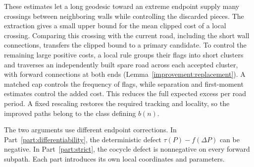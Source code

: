 These estimates let a long geodesic toward an extreme endpoint supply
many crossings between neighboring walls while controlling the discarded
pieces. The extraction gives a small upper bound for the mean clipped
cost of a local crossing. Comparing this crossing with the current road, including the
short wall connections, transfers the clipped bound to a primary
candidate. To control the remaining large positive costs, a local rule
groups their flags into short clusters and traverses an independently
built spare road across each accepted cluster, with forward connections
at both ends (Lemma~\ref{improvement:replacement}). A matched cap controls
the frequency of flags, while separation and first-moment estimates
control the added cost. This reduces the full expected excess per road
period. A fixed rescaling restores the required tracking and locality,
so the improved paths belong to the class defining $b(n)$.

The two arguments use different endpoint corrections. In
Part~\ref{part:differentiability}, the deterministic defect
$\tau(P)-f(\Delta P)$ can be negative. In Part~\ref{part:strict}, the
cocycle defect is nonnegative on every forward subpath. Each part
introduces its own local coordinates and parameters.
